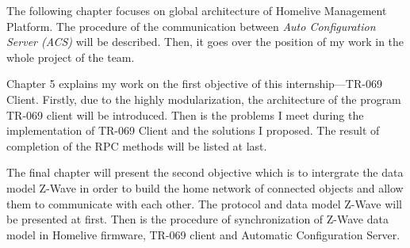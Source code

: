The following chapter focuses on global architecture of Homelive Management Platform. The procedure of the communication between \textit{Auto Configuration Server (ACS)} will be described. Then, it goes over the position of my work in the whole project of the team.

Chapter 5 explains my work on the first objective of this internship---TR-069 Client. Firstly, due to the highly modularization, the architecture of the program TR-069 client will be introduced. Then is the problems I meet during the implementation of TR-069 Client and the solutions I proposed. The result of completion of the RPC methods will be listed at last.

The final chapter will present the second objective which is to intergrate the data model Z-Wave in order to build the home network of connected objects and allow them to communicate with each other. The protocol and data model Z-Wave will be presented at first. Then is the procedure of synchronization of Z-Wave data model in Homelive firmware, TR-069 client and Automatic Configuration Server.   
